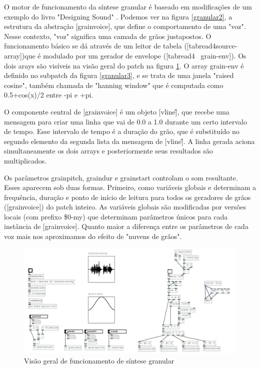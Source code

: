 \documentclass[draft]{ppgmus}
\begin{document}
O motor de funcionamento da síntese granular é baseado em modificações de um exemplo
do livro "Designing Sound" \cite{farnell2010designing}. Podemos ver na figura \ref{granular2}, a estrutura
da abstração [grainvoice], que define o comportamento de uma "voz". Nesse contexto,
"voz" significa uma camada de grãos justapostos. O funcionamento básico se dá através
de um leitor de tabela ([tabread4\texttildelow source-array])que é modulado por um gerador de envelope ([tabread4~ grain-env]).
Os dois arays são visíveis na visão geral do patch na figura \ref{granular-geral}. O array grain-env
é definido no subpatch da figura \ref{granular3}, e se trata de uma janela "raised cosine", também
chamada de "hanning window" que é computada como 0.5+cos(x)/2 entre -pi e +pi.

O componente central de [grainvoice] é um objeto [vline\~], que recebe uma mensagem para criar uma linha que 
vai de 0.0 a 1.0 durante um certo intervalo de tempo. Esse intervalo de tempo é a duração
do grão, que é substituído no segundo elemento da segunda lista da mensagem de [vline\~].
A linha gerada aciona simultaneamente os dois arrays e posteriormente 
seus resultados são multiplicados.

Os parâmetros grainpitch, graindur e grainstart controlam o som resultante. Esses aparecem sob duas
formas. Primeiro, como variáveis globais e determinam a frequência, duração e ponto de início de leitura para
todos os geradores de grãos ([grainvoice]) do patch inteiro. As variáveis globais são modificadas
por versões locais (com prefixo \$0-my) que determinam parâmetros únicos para cada instância de [grainvoice].
Quanto maior a diferença entre os parâmetros de cada voz mais nos aproximamos do efeito de "nuvens de grãos".

\begin{figure}
\includegraphics[scale=.6]{granular-geral}
\caption{Visão geral de funcionamento de síntese granular}
\label{granular-geral}
\end{figure}
\end{document}
